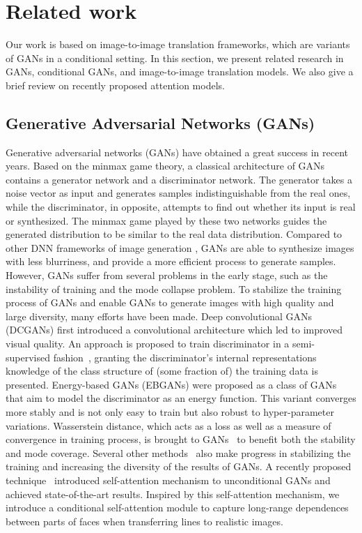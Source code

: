 \section{Related work}
\label{sec:related_work}
Our work is based on image-to-image translation frameworks, which are variants of GANs in a conditional setting. In this section, we present related research in GANs, conditional GANs, and image-to-image translation models. We also give a brief review on recently proposed attention models.
\subsection{Generative Adversarial Networks (GANs)}
Generative adversarial networks (GANs) \cite{GANs} have obtained a great success in recent years.
Based on the minmax game theory, a classical architecture of GANs contains a generator network and a discriminator network. The generator takes a noise vector as input and generates samples indistinguishable from the real ones, while the discriminator, in opposite, attempts to find out whether its input is real or synthesized. The minmax game played by these two networks guides the generated distribution to be similar to the real data distribution. 
Compared to other DNN frameworks of image generation \cite{VAEs, PixelCNN}, GANs are able to synthesize images with less blurriness, and provide a more efficient process to generate samples. However, GANs suffer from several problems in the early stage, such as the instability of training and the mode collapse problem. To stabilize the training process of GANs and enable GANs to generate images with high quality and large diversity, many efforts have been made. 
Deep convolutional GANs (DCGANs) \cite{DCGANs} first introduced a convolutional architecture which led to improved visual quality. 
An approach is proposed to train discriminator in a semi-supervised fashion~\cite{Improved_Techniques}, granting the discriminator's internal representations knowledge of the class structure of (some fraction of) the training data is presented. 
Energy-based GANs (EBGANs) \cite{EBGANs} were proposed as a class of GANs that aim to model the discriminator as an energy function. 
This variant converges more stably and is not only easy to train but also robust to hyper-parameter variations. 
Wasserstein distance, which acts as a loss as well as a measure of convergence in training process, is brought to GANs~\cite{WGANs, WGAN-GP} to benefit both the stability and mode coverage. 
Several other methods~\cite{LSGANs, BEGANs, DRAGANs} also make progress in stabilizing the training and increasing the diversity of the results of GANs. 
A recently proposed technique~\cite{SAGANs} introduced self-attention mechanism to unconditional GANs and achieved state-of-the-art results. 
%
Inspired by this self-attention mechanism, we introduce a conditional self-attention module to capture long-range dependences between parts of faces when transferring lines to realistic images. 
%

